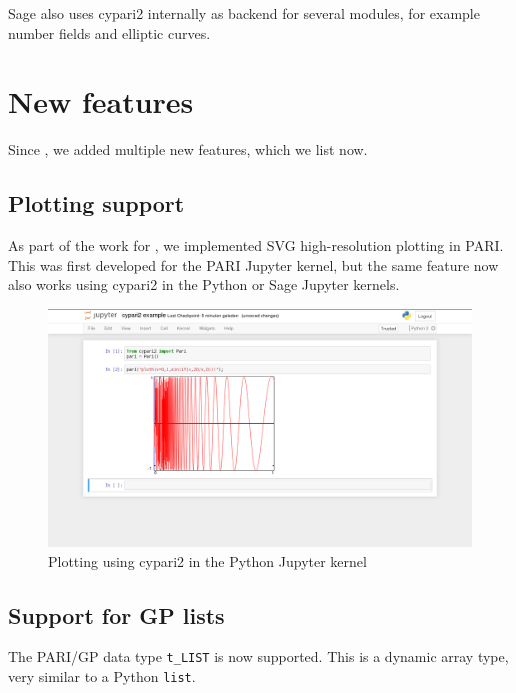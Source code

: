 \documentclass{deliverablereport}
\begin{document}
Sage also uses cypari2 internally as backend for several modules,
for example number fields and elliptic curves.

\section{New features}

Since ,
we added multiple new features, which we list now.

\subsection{Plotting support}

As part of the work for ,
we implemented SVG high-resolution plotting in PARI.
This was first developed for the PARI Jupyter kernel,
but the same feature now also works using cypari2
in the Python or Sage Jupyter kernels.

\begin{figure}[ht]
  \includegraphics[width=\textwidth,trim={60px 100px 60px 1px},clip]{jupyter-cypari2.png}
  \caption{Plotting using cypari2 in the Python Jupyter kernel}
\end{figure}

\subsection{Support for GP lists}


The PARI/GP data type \verb/t_LIST/ is now supported.
This is a dynamic array type, very similar to a Python \verb/list/.
\end{document}
